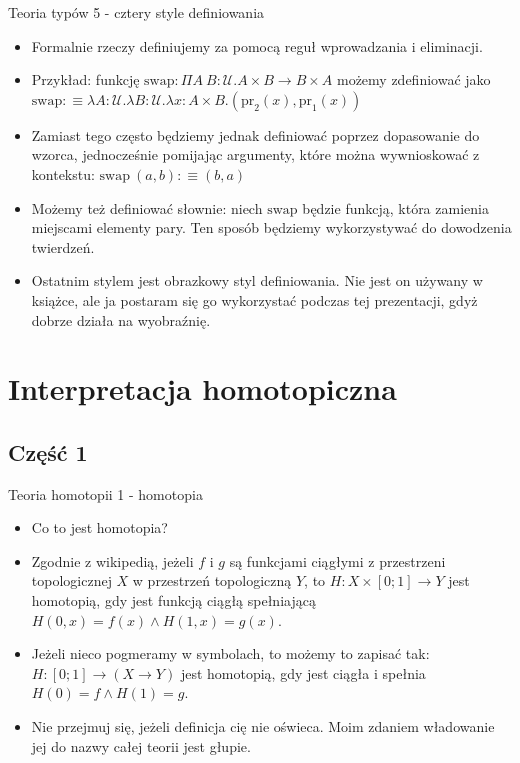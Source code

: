 \documentclass{beamer}
\newcommand{\defn}{:\equiv}
\newcommand{\U}{\mathcal{U}}
\newcommand{\prl}{\text{pr}_1}
\newcommand{\prr}{\text{pr}_2}
\begin{document}
\begin{frame}{Teoria typów 5 - cztery style definiowania}
\begin{itemize}
	\item Formalnie rzeczy definiujemy za pomocą reguł wprowadzania i eliminacji.
	\item Przykład: funkcję $\text{swap} : \Pi A\ B : \U. A \times B \to B \times A$ możemy zdefiniować jako $\text{swap} \defn \lambda A : \U.\lambda B : \U.\lambda x : A \times B. (\prr(x), \prl(x))$
	\item Zamiast tego często będziemy jednak definiować poprzez dopasowanie do wzorca, jednocześnie pomijając argumenty, które można wywnioskować z kontekstu: $\text{swap}\ (a, b) \defn (b, a)$
	\item Możemy też definiować słownie: niech $\text{swap}$ będzie funkcją, która zamienia miejscami elementy pary. Ten sposób będziemy wykorzystywać do dowodzenia twierdzeń.
	\item Ostatnim stylem jest obrazkowy styl definiowania. Nie jest on używany w książce, ale ja postaram się go wykorzystać podczas tej prezentacji, gdyż dobrze działa na wyobraźnię.
\end{itemize}
\end{frame}

\section{Interpretacja homotopiczna}

\subsection{Część 1}

\begin{frame}{Teoria homotopii 1 - homotopia}
\begin{itemize}
	\item Co to jest homotopia?
	\item Zgodnie z wikipedią, jeżeli $f$ i $g$ są funkcjami ciągłymi z przestrzeni topologicznej $X$ w przestrzeń topologiczną $Y$, to $H : X \times [0; 1] \to Y$ jest homotopią, gdy jest funkcją ciągłą spełniającą $H(0, x) = f(x) \land H(1, x) = g(x)$.
	\item Jeżeli nieco pogmeramy w symbolach, to możemy to zapisać tak: $H: [0; 1] \to (X \to Y)$ jest homotopią, gdy jest ciągła i spełnia $H(0) = f \land H(1) = g$.
	\item Nie przejmuj się, jeżeli definicja cię nie oświeca. Moim zdaniem władowanie jej do nazwy całej teorii jest głupie.
\end{itemize}
\end{frame}
\end{document}

